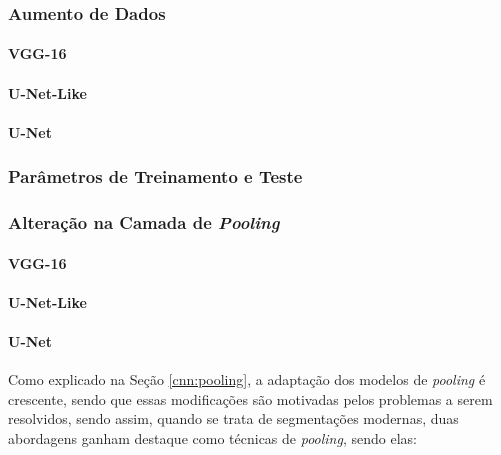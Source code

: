 \subsubsection{Aumento de Dados}
\label{project:augment}

\paragraph{VGG-16}

\paragraph{U-Net-Like}

\paragraph{U-Net}

\subsubsection{Parâmetros de Treinamento e Teste}
\label{project:params}


\subsubsection{Alteração na Camada de \textit{Pooling}}
\label{project:change_pooling}


\paragraph{VGG-16}

\paragraph{U-Net-Like}

\paragraph{U-Net}

Como explicado na Seção \ref{cnn:pooling}, a adaptação dos modelos de \textit{pooling} é crescente, sendo que essas modificações são motivadas pelos problemas a serem resolvidos, sendo assim, quando se trata de segmentações modernas, duas abordagens ganham destaque como técnicas de \textit{pooling}, sendo elas:


